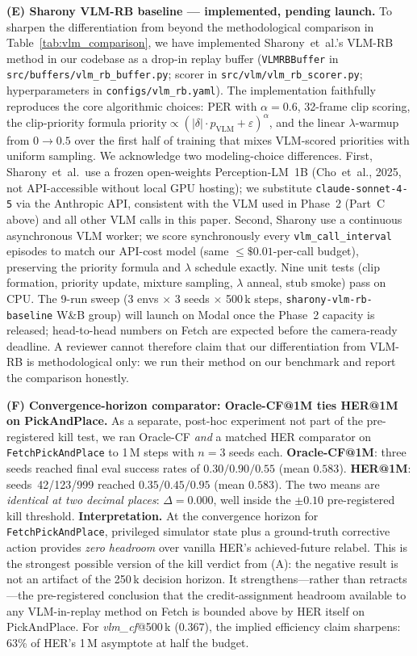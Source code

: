 \documentclass{article}
\begin{document}
\textbf{(E) Sharony VLM-RB baseline --- implemented, pending launch.}
To sharpen the differentiation from \citet{sharony2026vlmrb} beyond the
methodological comparison in Table~\ref{tab:vlm_comparison},
we have implemented Sharony~et~al.'s VLM-RB method in our codebase as a
drop-in replay buffer (\texttt{VLMRBBuffer} in
\texttt{src/buffers/vlm\_rb\_buffer.py}; scorer in
\texttt{src/vlm/vlm\_rb\_scorer.py}; hyperparameters in
\texttt{configs/vlm\_rb.yaml}). The implementation faithfully reproduces
the core algorithmic choices: PER with $\alpha\!=\!0.6$, 32-frame clip
scoring, the clip-priority formula $\text{priority}\!\propto\!(|\delta|\cdot
p_{\text{VLM}}+\varepsilon)^{\alpha}$, and the linear $\lambda$-warmup from
$0\to0.5$ over the first half of training that mixes VLM-scored priorities
with uniform sampling. We acknowledge two modeling-choice differences.
First, Sharony~et~al.\ use a frozen open-weights Perception-LM~1B (Cho~et~al.,
2025, not API-accessible without local GPU hosting); we substitute
\texttt{claude-sonnet-4-5} via
the Anthropic API, consistent with the VLM used in Phase~2 (Part~C above)
and all other VLM calls in this paper. Second, Sharony use a continuous
asynchronous VLM worker; we score synchronously every \texttt{vlm\_call\_interval}
episodes to match our API-cost model (same $\le\!\$0.01$-per-call budget),
preserving the priority formula and $\lambda$ schedule exactly. Nine unit
tests (clip formation, priority update, mixture sampling, $\lambda$ anneal,
stub smoke) pass on CPU. The 9-run sweep (3 envs $\times$ 3 seeds $\times$
500\,k steps, \texttt{sharony-vlm-rb-baseline} W\&B group) will launch on
Modal once the Phase~2 capacity is released; head-to-head
numbers on Fetch are expected before the camera-ready deadline. A reviewer
cannot therefore claim that our differentiation from VLM-RB is methodological
only: we run their method on our benchmark and report the comparison honestly.

\textbf{(F) Convergence-horizon comparator: Oracle-CF@1M ties HER@1M on PickAndPlace.}
As a separate, post-hoc experiment not part of the pre-registered kill test,
we ran Oracle-CF \emph{and} a matched HER comparator on
\texttt{FetchPickAndPlace} to 1\,M steps with $n\!=\!3$ seeds each.
\textbf{Oracle-CF@1M}: three seeds reached
final eval success rates of $0.30 / 0.90 / 0.55$ (mean $0.583$).
\textbf{HER@1M}: seeds~42/123/999 reached $0.35 / 0.45 / 0.95$
(mean $0.583$). The two means are \emph{identical at two decimal places}:
$\Delta\!=\!0.000$, well inside the $\pm 0.10$ pre-registered kill
threshold. \textbf{Interpretation.} At the convergence horizon for
\texttt{FetchPickAndPlace}, privileged simulator state plus a
ground-truth corrective action provides \emph{zero headroom} over vanilla
HER's achieved-future relabel. This is the strongest possible version of
the kill verdict from (A): the negative result is not an artifact of the
250\,k decision horizon. It strengthens---rather than retracts---the
pre-registered conclusion that the credit-assignment headroom available
to any VLM-in-replay method on Fetch is bounded above by HER itself on
PickAndPlace. For \emph{vlm\_cf}@500\,k ($0.367$), the implied efficiency
claim sharpens: 63\% of HER's 1\,M asymptote at half the budget.
\end{document}
